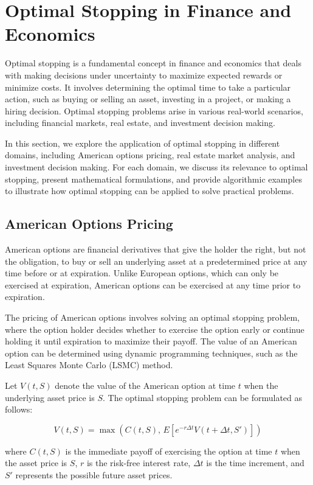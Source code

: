 \documentclass[12pt]{book} %
\begin{document}
\section{Optimal Stopping in Finance and Economics}

Optimal stopping is a fundamental concept in finance and economics that deals with making decisions under uncertainty to maximize expected rewards or minimize costs. It involves determining the optimal time to take a particular action, such as buying or selling an asset, investing in a project, or making a hiring decision. Optimal stopping problems arise in various real-world scenarios, including financial markets, real estate, and investment decision making.

In this section, we explore the application of optimal stopping in different domains, including American options pricing, real estate market analysis, and investment decision making. For each domain, we discuss its relevance to optimal stopping, present mathematical formulations, and provide algorithmic examples to illustrate how optimal stopping can be applied to solve practical problems.

\subsection{American Options Pricing}

American options are financial derivatives that give the holder the right, but not the obligation, to buy or sell an underlying asset at a predetermined price at any time before or at expiration. Unlike European options, which can only be exercised at expiration, American options can be exercised at any time prior to expiration.

The pricing of American options involves solving an optimal stopping problem, where the option holder decides whether to exercise the option early or continue holding it until expiration to maximize their payoff. The value of an American option can be determined using dynamic programming techniques, such as the Least Squares Monte Carlo (LSMC) method.

Let \(V(t, S)\) denote the value of the American option at time \(t\) when the underlying asset price is \(S\). The optimal stopping problem can be formulated as follows:

\[
V(t, S) = \max \left( C(t, S), \, E \left[ e^{-r\Delta t}V(t + \Delta t, S') \right] \right)
\]

where \(C(t, S)\) is the immediate payoff of exercising the option at time \(t\) when the asset price is \(S\), \(r\) is the risk-free interest rate, \(\Delta t\) is the time increment, and \(S'\) represents the possible future asset prices.
\end{document}
